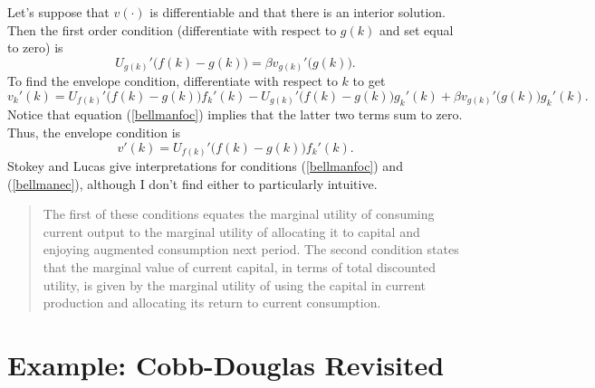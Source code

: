 \documentclass[12pt]{article}
\theoremstyle{definition}
\begin{document}
Let's suppose that $v(\cdot)$ is differentiable and that there is an interior solution. Then the first order condition (differentiate with respect to $g(k)$ and set equal to zero) is
\begin{equation}
	U_{g(k)}'\big( f(k) - g(k) \big) = \beta v_{g(k)}'\big( g(k) \big). \label{bellmanfoc}
\end{equation}
To find the envelope condition, differentiate with respect to $k$ to get
\[
	v_{k}'(k) = U_{f(k)}'\big( f(k)-g(k)\big)f_k'(k) - U_{g(k)}'\big( f(k)-g(k)\big)g_k'(k) + \beta v_{g(k)}'\big(g(k)\big)g_k'(k).
\]
Notice that equation (\ref{bellmanfoc}) implies that the latter two terms sum to zero. Thus, the envelope condition is
\begin{equation}
	v'(k)=U_{f(k)}'\big( f(k)-g(k)\big)f_k'(k). \label{bellmanec}
\end{equation}
Stokey and Lucas give interpretations for  conditions (\ref{bellmanfoc}) and (\ref{bellmanec}), although I don't find either to particularly intuitive.
\begin{quote}
	The first of these conditions equates the marginal utility of consuming current output to the marginal utility of allocating it to capital and enjoying augmented consumption next period. The second condition states that the marginal value of current capital, in terms of total discounted utility, is given by the marginal utility of using the capital in current production and allocating its return to current consumption.
\end{quote}


\section{Example: Cobb-Douglas Revisited}
\end{document}
